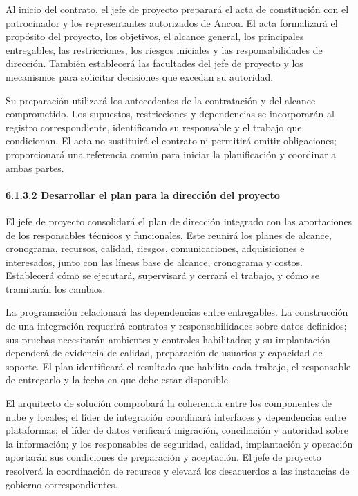 \documentclass[11pt]{article}
\begin{document}
Al inicio del contrato, el jefe de proyecto preparará el acta de constitución con el patrocinador y los representantes autorizados de Ancoa. El acta formalizará el propósito del proyecto, los objetivos, el alcance general, los principales entregables, las restricciones, los riesgos iniciales y las responsabilidades de dirección. También establecerá las facultades del jefe de proyecto y los mecanismos para solicitar decisiones que excedan su autoridad.

Su preparación utilizará los antecedentes de la contratación y del
alcance comprometido. Los supuestos, restricciones y dependencias se
incorporarán al registro correspondiente, identificando su responsable y
el trabajo que condicionan. El acta no sustituirá el contrato ni
permitirá omitir obligaciones; proporcionará una referencia común para
iniciar la planificación y coordinar a ambas partes.

\paragraph{6.1.3.2 Desarrollar el plan para la dirección del proyecto}\label{6-1-3-2-desarrollar-el-plan-para-la-direccion-del-proyecto}

El jefe de proyecto consolidará el plan de dirección integrado con las aportaciones de los responsables técnicos y funcionales. Este reunirá los planes de alcance, cronograma, recursos, calidad, riesgos, comunicaciones, adquisiciones e interesados, junto con las líneas base de alcance, cronograma y costos. Establecerá cómo se ejecutará, supervisará y cerrará el trabajo, y cómo se tramitarán los cambios.

La programación relacionará las dependencias entre entregables. La
construcción de una integración requerirá contratos y responsabilidades
sobre datos definidos; sus pruebas necesitarán ambientes y controles
habilitados; y su implantación dependerá de evidencia de calidad,
preparación de usuarios y capacidad de soporte. El plan identificará el
resultado que habilita cada trabajo, el responsable de entregarlo y la
fecha en que debe estar disponible.

El arquitecto de solución comprobará la coherencia entre los componentes
de nube y locales; el líder de integración coordinará interfaces y
dependencias entre plataformas; el líder de datos verificará migración,
conciliación y autoridad sobre la información; y los responsables de
seguridad, calidad, implantación y operación aportarán sus condiciones
de preparación y aceptación. El jefe de proyecto resolverá la
coordinación de recursos y elevará los desacuerdos a las instancias de
gobierno correspondientes.
\end{document}
